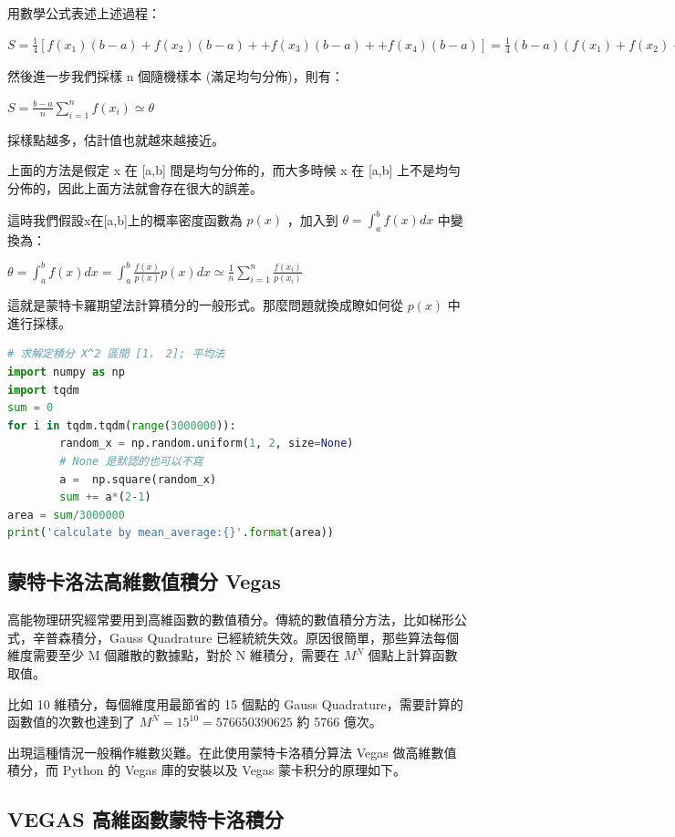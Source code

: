\documentclass[10pt,UTF8]{ctexart}
\begin{document}
用數學公式表述上述過程：

$S = \frac{1}{4} [f(x_{1})(b - a) + f(x_{2})(b - a) + + f(x_{3})(b - a) + + f(x_{4})(b - a)] = \frac{1}{4} (b - a)(f(x_{1}) + f(x_{2}) + f(x_{3}) + f(x_{4})) = \frac{1}{4} (b - a)\sum_{i=1}^{4} f(x_{i}) $

然後進一步我們採樣 n 個隨機樣本 (滿足均勻分佈)，則有：

$S = \frac{b - a}{n} \sum_{i=1}^{n} f(x_{i})\simeq \theta$

採樣點越多，估計值也就越來越接近。

上面的方法是假定 x 在 [a,b] 間是均勻分佈的，而大多時候 x 在 [a,b] 上不是均勻分佈的，因此上面方法就會存在很大的誤差。

這時我們假設x在[a,b]上的概率密度函數為 $p(x)$ ，加入到 $\theta=\int_{a}^{b} f(x) d x$ 中變換為：

 $\theta=\int_{a}^{b} f(x) d x = \int_{a}^{b} \frac{f(x)}{p(x)} p(x) d x \simeq \frac{1}{n} \sum_{i=1}^{n} \frac{f(x_{i})}{p(x_{i})}$

這就是蒙特卡羅期望法計算積分的一般形式。那麼問題就換成瞭如何從 $p(x)$ 中進行採樣。

\begin{lstlisting}[language={python}]
# 求解定積分 X^2 區間 [1， 2]; 平均法
import numpy as np
import tqdm
sum = 0
for i in tqdm.tqdm(range(3000000)):
        random_x = np.random.uniform(1, 2, size=None)
        # None 是默認的也可以不寫
        a =  np.square(random_x)
        sum += a*(2-1)
area = sum/3000000
print('calculate by mean_average:{}'.format(area))
\end{lstlisting}

\subsection{蒙特卡洛法高維數值積分 Vegas}

高能物理研究經常要用到高維函數的數值積分。傳統的數值積分方法，比如梯形公式，辛普森積分，Gauss Quadrature 已經統統失效。原因很簡單，那些算法每個維度需要至少 M 個離散的數據點，對於 N 維積分，需要在 $M^{N}$ 個點上計算函數取值。

比如 10 維積分，每個維度用最節省的 15 個點的 Gauss Quadrature，需要計算的函數值的次數也達到了 $M^{N} = 15^{10} = 576650390625$ 約 5766 億次。

出現這種情況一般稱作維數災難。在此使用蒙特卡洛積分算法 Vegas 做高維數值積分，而 Python 的 Vegas 庫的安裝以及 Vegas 蒙卡积分的原理如下。

\subsection{VEGAS 高維函數蒙特卡洛積分}
\end{document}
